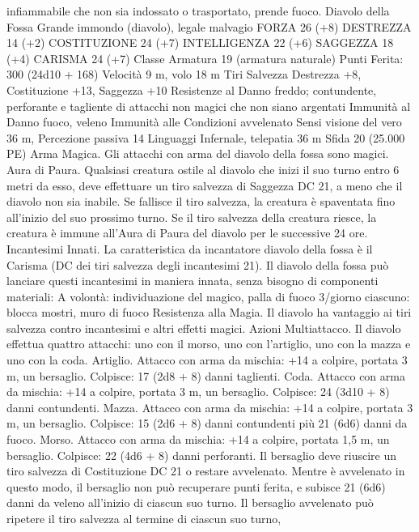 \begin{multicols}{2}
infiammabile che non sia indossato o trasportato, prende fuoco.
Diavolo della Fossa
Grande immondo (diavolo), legale malvagio
FORZA 26 (+8)
DESTREZZA 14 (+2)
COSTITUZIONE 24 (+7)
INTELLIGENZA 22 (+6)
SAGGEZZA 18 (+4)
CARISMA 24 (+7)
Classe Armatura 19 (armatura naturale)
\hspace*{0pt}\hfill{Punti Ferita}: 300 (24d10 + 168)
Velocità 9 m, volo 18 m
Tiri Salvezza Destrezza +8, Costituzione +13, Saggezza +10
Resistenze al Danno freddo; contundente, perforante e tagliente
di attacchi non magici che non siano argentati
Immunità al Danno fuoco, veleno
Immunità alle Condizioni avvelenato
Sensi visione del vero 36 m, Percezione passiva 14
Linguaggi Infernale, telepatia 36 m
Sfida 20 (25.000 PE)
Arma Magica. Gli attacchi con arma del diavolo della fossa sono
magici.
Aura di Paura. Qualsiasi creatura ostile al diavolo che inizi il
suo turno entro 6 metri da esso, deve effettuare un tiro salvezza
di Saggezza DC 21, a meno che il diavolo non sia inabile. Se
fallisce il tiro salvezza, la creatura è spaventata fino all’inizio del
suo prossimo turno. Se il tiro salvezza della creatura riesce, la
creatura è immune all’Aura di Paura del diavolo per le
successive 24 ore.
Incantesimi Innati. La caratteristica da incantatore diavolo della
fossa è il Carisma (DC dei tiri salvezza degli incantesimi 21). Il
diavolo della fossa può lanciare questi incantesimi in maniera
innata, senza bisogno di componenti materiali:
A volontà: individuazione del magico, palla di fuoco
3/giorno ciascuno: blocca mostri, muro di fuoco
Resistenza alla Magia. Il diavolo ha vantaggio ai tiri salvezza
contro incantesimi e altri effetti magici.
Azioni
Multiattacco. Il diavolo effettua quattro attacchi: uno con il
morso, uno con l’artiglio, uno con la mazza e uno con la coda.
Artiglio. Attacco con arma da mischia: +14 a colpire, portata 3
m, un bersaglio.
Colpisce: 17 (2d8 + 8) danni taglienti.
Coda. Attacco con arma da mischia: +14 a colpire, portata 3 m,
un bersaglio.
Colpisce: 24 (3d10 + 8) danni contundenti.
Mazza. Attacco con arma da mischia: +14 a colpire, portata 3 m,
un bersaglio.
Colpisce: 15 (2d6 + 8) danni contundenti più 21 (6d6) danni da
fuoco.
Morso. Attacco con arma da mischia: +14 a colpire, portata 1,5
m, un bersaglio.
Colpisce: 22 (4d6 + 8) danni perforanti. Il bersaglio deve riuscire
un tiro salvezza di Costituzione DC 21 o restare avvelenato.
Mentre è avvelenato in questo modo, il bersaglio non può
recuperare punti ferita, e subisce 21 (6d6) danni da veleno
all’inizio di ciascun suo turno. Il bersaglio avvelenato può
ripetere il tiro salvezza al termine di ciascun suo turno,

\end{multicols}
